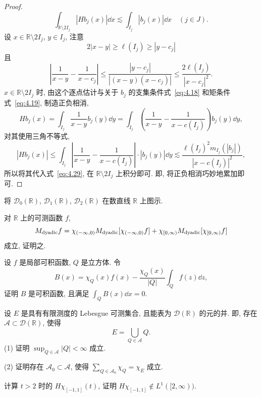 \begin{proof}
\begin{equation}
\int_{\mathbb{R}\setminus 2I_{j}}|Hb_{j}(x)|\dd x \lesssim \int_{I_{j}}|b_{j}(x)|\dd x \quad (j \in J).
\label{eq:4.29}
\end{equation}
设 $x \in \mathbb{R}\setminus 2I_{j}$, $y \in I_{j}$, 注意
\[
2|x-y| \geq \ell(I_{j}) \geq |y-c_{j}|
\]
且
\[
\left|\frac{1}{x-y} - \frac{1}{x-c_{j}}\right| \leq \frac{|y-c_{j}|}{|(x-y)(x-c_{j})|} \leq \frac{2\ell(I_{j})}{|x-c_{j}|^{2}}.
\]
$x \in \mathbb{R}\setminus 2I_{j}$ 时, 由这个逐点估计与关于 $b_{j}$ 的支集条件式~\eqref{eq:4.18} 和矩条件式~\eqref{eq:4.19}, 制造正负相消,
\[
Hb_{j}(x) = \int_{I_{j}}\frac{1}{x-y}b_{j}(y)\dd y = \int_{I_{j}}\left(\frac{1}{x-y} - \frac{1}{x-c(I_{j})}\right)b_{j}(y)\dd y,
\]
对其使用三角不等式,
\[
|Hb_{j}(x)| \leq \int_{I_{j}}\left|\frac{1}{x-y} - \frac{1}{x-c(I_{j})}\right| \cdot |b_{j}(y)|\dd y \lesssim \frac{\ell(I_{j})^{2}m_{I_{j}}(|b_{j}|)}{|x-c(I_{j})|^{2}},
\]
所以将其代入式~\eqref{eq:4.29}, 在 $\mathbb{R}\setminus 2I_{j}$ 上积分即可. 即, 将正负相消巧妙地累加即可.
\end{proof}

\begin{exercise}\label{exer:4.6}
将 $\mathcal{D}_{0}(\mathbb{R})$, $\mathcal{D}_{1}(\mathbb{R})$, $\mathcal{D}_{2}(\mathbb{R})$ 在数直线 $\mathbb{R}$ 上图示.
\end{exercise}

\begin{exercise}\label{exer:4.7}
对 $\mathbb{R}$ 上的可测函数 $f$,
\[
M_{\mathrm{dyadic}}f = \chi_{(-\infty, 0)}M_{\mathrm{dyadic}}[\chi_{(-\infty, 0)}f] + \chi_{[0, \infty)}M_{\mathrm{dyadic}}[\chi_{[0, \infty)}f]
\]
成立, 证明之.
\end{exercise}

\begin{exercise}\label{exer:4.8}
设 $f$ 是局部可积函数, $Q$ 是立方体. 令
\[
B(x) = \chi_{Q}(x)f(x) - \frac{\chi_{Q}(x)}{|Q|}\int_{Q}f(z)\dd z,
\]
证明 $B$ 是可积函数, 且满足 $\int_{Q}B(x)\dd x = 0$.
\end{exercise}

\begin{exercise}\label{exer:4.9}
设 $E$ 是具有有限测度的 Lebesgue 可测集合, 且能表为 $\mathcal{D}(\mathbb{R})$ 的元的并. 即, 存在 $\mathcal{A} \subset \mathcal{D}(\mathbb{R})$, 使得
\[
E = \bigcup_{Q \in \mathcal{A}}Q.
\]
(1) 证明 $\sup_{Q \in \mathcal{A}}|Q| < \infty$ 成立.

(2) 证明存在 $\mathcal{A}_{0} \subset \mathcal{A}$, 使得 $\sum_{Q \in \mathcal{A}_{0}}\chi_{Q} = \chi_{E}$ 成立.
\end{exercise}

\begin{exercise}\label{exer:4.10}
计算 $t > 2$ 时的 $H\chi_{[-1,1]}(t)$, 证明 $H\chi_{[-1,1]} \notin L^{1}([2, \infty))$.
\end{exercise}
